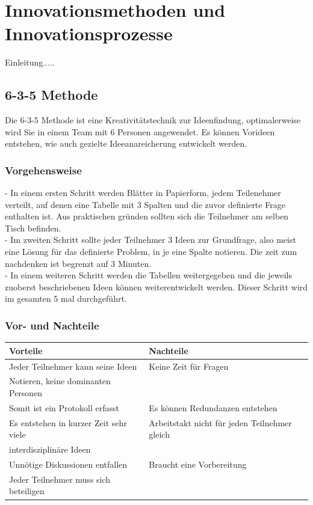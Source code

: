 \section{Innovationsmethoden und Innovationsprozesse}
Einleitung.....



\subsection{6-3-5 Methode}\label{subsec:635Methode}
Die 6-3-5 Methode ist eine Kreativitätstechnik zur Ideenfindung, optimalerweise wird Sie in einem Team mit 6 Personen angewendet. Es können Vorideen entstehen, wie auch gezielte Ideeanareicherung entwickelt werden.
\subsubsection{Vorgehensweise}
- In einem ersten Schritt werden Blätter in Papierform, jedem Teilenehmer verteilt, auf denen eine Tabelle mit 3 Spalten und die zuvor definierte Frage enthalten ist. Aus praktischen gründen sollten sich die Teilnehmer am selben Tisch befinden.\\
- Im zweiten Schritt sollte jeder Teilnehmer 3 Ideen zur Grundfrage, also meist eine Lösung für das definierte Problem, in je eine Spalte notieren. Die zeit zum nachdenken ist begrenzt auf 3 Minuten.\\
- In einem weiteren Schritt werden die Tabellen weitergegeben und die jeweils zuoberst beschriebenen Ideen können weiterentwickelt werden. Dieser Schritt wird im gesamten 5 mal durchgeführt.
\subsubsection{Vor- und Nachteile}
\begin{tabular}{|l|l|}
	\hline 
	\textbf{Vorteile} & \textbf{Nachteile} \\ 
	\hline 
	Jeder Teilnehmer kann seine Ideen & Keine Zeit für Fragen  \\
	 Notieren, keine dominanten Personen&\\ 
	\hline 
	Somit ist ein Protokoll erfasst&Es können Redundanzen entstehen \\ 
	\hline 
	Es entstehen in kurzer Zeit sehr viele&Arbeitstakt nicht für jeden Teilnehmer gleich\\
	interdisziplinäre Ideen&  \\ 
	\hline 
	Unnötige Diskussionen entfallen&Braucht eine Vorbereitung \\ 
	\hline 
	Jeder Teilnehmer muss sich beteiligen&  \\ 
	\hline 
\end{tabular} 
